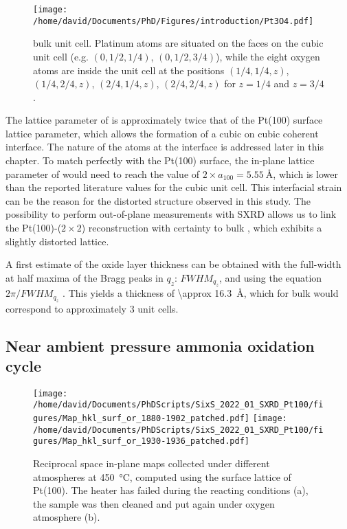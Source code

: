 \begin{SCfigure}
    \centering
    \texttt{[image: /home/david/Documents/PhD/Figures/introduction/Pt3O4.pdf]}
    \caption{
         bulk unit cell.
        Platinum atoms are situated on the faces on the cubic unit cell (e.g. $(0, 1/2, 1/4)$, $(0, 1/2, 3/4)$), while the eight oxygen atoms are inside the unit cell at the positions $(1/4, 1/4, z)$, $(1/4, 2/4, z)$, $(2/4, 1/4, z)$, $(2/4, 2/4, z)$ for $z=1/4$ and $z=3/4$.
    }
    \label{fig:Pt3O4}
\end{SCfigure}

The lattice parameter of  is approximately twice that of the Pt(100) surface lattice parameter, which allows the formation of a cubic on cubic coherent interface.
The nature of the atoms at the interface is addressed later in this chapter.
To match perfectly with the Pt(100) surface, the in-plane lattice parameter of  would need to reach the value of $2\times a_{100} =\qty{5.55}{\angstrom}$, which is lower than the reported literature values for the cubic unit cell.
This interfacial strain can be the reason for the distorted structure observed in this study.
The possibility to perform out-of-plane measurements with SXRD allows us to link the Pt(100)-($2\times2$) reconstruction with certainty to bulk , which exhibits a slightly distorted lattice.

A first estimate of the oxide layer thickness can be obtained with the full-width at half maxima of the Bragg peaks in $q_z$: $FWHM_{q_z}$, and using the equation $2\pi/FWHM_{q_z}$ \parencite{Patterson1939, Warren1990}.
This yields a thickness of \qty{\approx 16.3}{\angstrom}, which for bulk  would correspond to approximately \num{3} unit cells.

\subsection{Near ambient pressure ammonia oxidation cycle}

\begin{figure}[!htb]
    \centering
    \texttt{[image: /home/david/Documents/PhDScripts/SixS\_2022\_01\_SXRD\_Pt100/figures/Map\_hkl\_surf\_or\_1880-1902\_patched.pdf]}
    \texttt{[image: /home/david/Documents/PhDScripts/SixS\_2022\_01\_SXRD\_Pt100/figures/Map\_hkl\_surf\_or\_1930-1936\_patched.pdf]}
    \caption{
        Reciprocal space in-plane maps collected under different atmospheres at \qty{450}{\degreeCelsius}, computed using the surface lattice of Pt(100).
        The heater has failed during the reacting conditions (a), the sample was then cleaned and put again under oxygen atmosphere (b).
    }
    \label{fig:MapsPt100B}
\end{figure}

